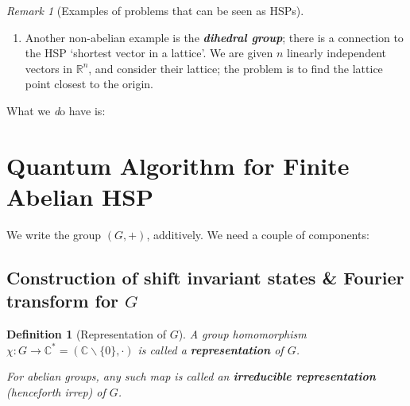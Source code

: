 \documentclass[]{article}
\theoremstyle{custhm}
\theoremstyle{cusdef}
\theoremstyle{custhm}
\theoremstyle{custhm}
\theoremstyle{custhm}
\theoremstyle{custhm}
\theoremstyle{cusdef}
\newtheorem*{defin*}{Definition}
\theoremstyle{remark}
\newtheorem*{remark*}{Remark}
\newcommand{\R}{\mathbb{R}}
\newcommand{\C}{\mathbb{C}}
\newcommand{\ra}{\rightarrow}
\newcommand{\undf}[1]{\textit{\textbf{#1}}}
\renewcommand{\it}[1]{\textit{#1}}
\newcommand{\poly}{\textrm{poly}}
\begin{document}
\begin{remark*}[Examples of problems that can be seen as HSPs]
\begin{enumerate}[label = (\alph*)]
	We currently do not believe that even quantum algorithms are able to solve NP-complete problems efficiently, so it is in some sense hopeless to try and work on these problems even from a quantum perspective. However, they can do NP-incomplete problems, so factoring and GI \it{etc}... are good candidates to attempt.
	
	Laslo Babai (2017) found a \it{quasi}-polynomial time \it{classical} algorithm for GI; it has runtime $n^{O((\log n)^2)}$. This is slower than polynomial time, but faster than exponential time. We have the following hierarchy:
	
	\begin{align*}
		\poly (n) < n^{O((\log n)^2)} < \textrm{exp}\\
		2^{O(\log n)} < 2^O((\log n)^3) < 2^{O(n)}
	\end{align*}

So in terms of exponents, these are linear/polynomial/exponential in $\log n$.
\item Another non-abelian example is the \undf{dihedral group}; there is a connection to the HSP `shortest vector in a lattice'. We are given $n$ linearly independent vectors in $\R^n$, and consider their lattice; the problem is to find the lattice point closest to the origin.
\end{enumerate}
\end{remark*}


What we {\it do} have is:

\section*{Quantum Algorithm for Finite Abelian HSP}

We write the group $(G,+)$, additively. We need a couple of components:

\subsection*{Construction of shift invariant states \& Fourier transform for $G$}
\begin{defin*}[Representation of $G$]
A group homomorphism $\chi :G\ra\C^\ast = (\C\backslash\{0\},\cdot)$ is called a \undf{representation} of $G$.

For abelian groups, any such map is called an \undf{irreducible representation} (henceforth {\it irrep}) of $G$.
\end{defin*}
\end{document}
